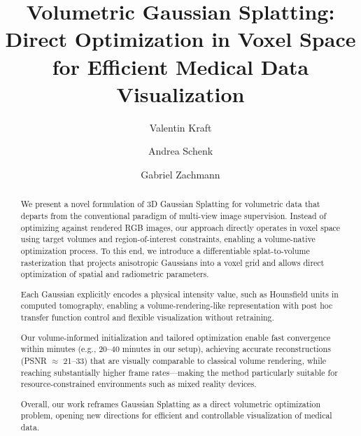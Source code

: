 \documentclass[runningheads]{llncs}
\begin{document}
%
\title{Volumetric Gaussian Splatting: Direct Optimization in Voxel Space for Efficient Medical Data Visualization}
%
%
\author{Valentin Kraft \and
Andrea Schenk \and
Gabriel Zachmann}
%
%
%
\maketitle              %
%
\begin{abstract}
We present a novel formulation of 3D Gaussian Splatting for volumetric data that departs from the conventional paradigm of multi-view image supervision. Instead of optimizing against rendered RGB images, our approach directly operates in voxel space using target volumes and region-of-interest constraints, enabling a volume-native optimization process. To this end, we introduce a differentiable splat-to-volume rasterization that projects anisotropic Gaussians into a voxel grid and allows direct optimization of spatial and radiometric parameters.

Each Gaussian explicitly encodes a physical intensity value, such as Hounsfield units in computed tomography, enabling a volume-rendering-like representation with post hoc transfer function control and flexible visualization without retraining.

Our volume-informed initialization and tailored optimization enable fast convergence within minutes (e.g., 20--40 minutes in our setup), achieving accurate reconstructions (PSNR $\approx$ 21--33) that are visually comparable to classical volume rendering, while reaching substantially higher frame rates—making the method particularly suitable for resource-constrained environments such as mixed reality devices.

Overall, our work reframes Gaussian Splatting as a direct volumetric optimization problem, opening new directions for efficient and controllable visualization of medical data.

\end{abstract}
%
%
%
\end{document}
